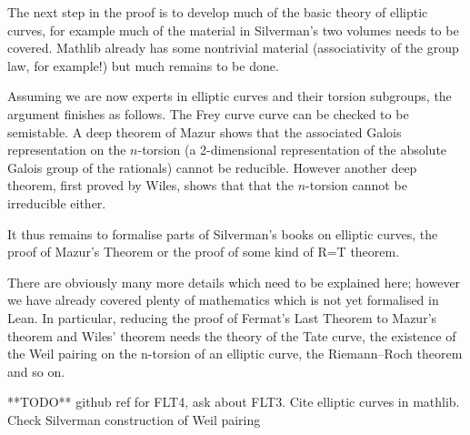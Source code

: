 The next step in the proof is to develop much of the basic theory of elliptic curves, for example much of the material in Silverman's two volumes needs to be covered. Mathlib already has some nontrivial material (associativity of the group law, for example!) but much remains to be done.

Assuming we are now experts in elliptic curves and their torsion subgroups, the argument finishes as follows. The Frey curve curve can be checked to be semistable. A deep theorem of Mazur shows that the associated Galois representation on the $n$-torsion (a 2-dimensional representation of the absolute Galois group of the rationals) cannot be reducible. However another deep theorem, first proved by Wiles, shows that that the $n$-torsion cannot be irreducible either.

It thus remains to formalise parts of Silverman's books on elliptic curves, the proof of Mazur's Theorem or the proof of some kind of R=T theorem.

There are obviously many more details which need to be explained here; however we have already covered plenty of mathematics which is not yet formalised in Lean. In particular, reducing the proof of Fermat's Last Theorem to Mazur's theorem and Wiles' theorem needs the theory of the Tate curve, the existence of the Weil pairing on the n-torsion of an elliptic curve, the Riemann--Roch theorem and so on. 

**TODO** github ref for FLT4, ask about FLT3. Cite elliptic curves in mathlib. Check Silverman construction of Weil pairing 
